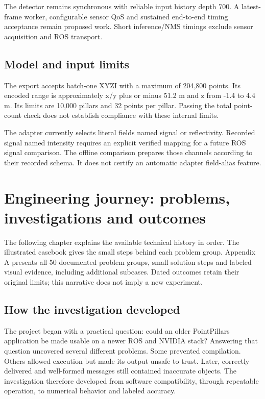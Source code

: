 \documentclass[11pt,a4paper]{article}
\begin{document}
The detector remains synchronous with reliable input history depth 700. A
latest-frame worker, configurable sensor QoS and sustained end-to-end timing
acceptance remain proposed work. Short inference/NMS timings exclude sensor
acquisition and ROS transport.

\subsection{Model and input limits}
The export accepts batch-one XYZI with a maximum of 204,800 points. Its encoded
range is approximately x/y plus or minus 51.2 m and z from -1.4 to 4.4 m. Its
limits are 10,000 pillars and 32 points per pillar. Passing the total point-count
check does not establish compliance with these internal limits.

The adapter currently selects literal fields named signal or reflectivity.
Recorded signal named intensity requires an explicit verified mapping for a
future ROS signal comparison. The offline comparison prepares those channels
according to their recorded schema. It does not certify an automatic adapter
field-alias feature.

\section{Engineering journey: problems, investigations and outcomes}
The following chapter explains the available technical history in order. The illustrated casebook gives the small steps behind each problem group. Appendix A presents all 50 documented problem groups, small solution steps and labeled visual evidence, including additional subcases. Dated outcomes retain their original limits; this narrative does not imply a new experiment.

\subsection{How the investigation developed}

The project began with a practical question: could an older PointPillars application be made usable on a newer ROS and NVIDIA stack? Answering that question uncovered several different problems. Some prevented compilation. Others allowed execution but made its output unsafe to trust. Later, correctly delivered and well-formed messages still contained inaccurate objects. The investigation therefore developed from software compatibility, through repeatable operation, to numerical behavior and labeled accuracy.
\end{document}
